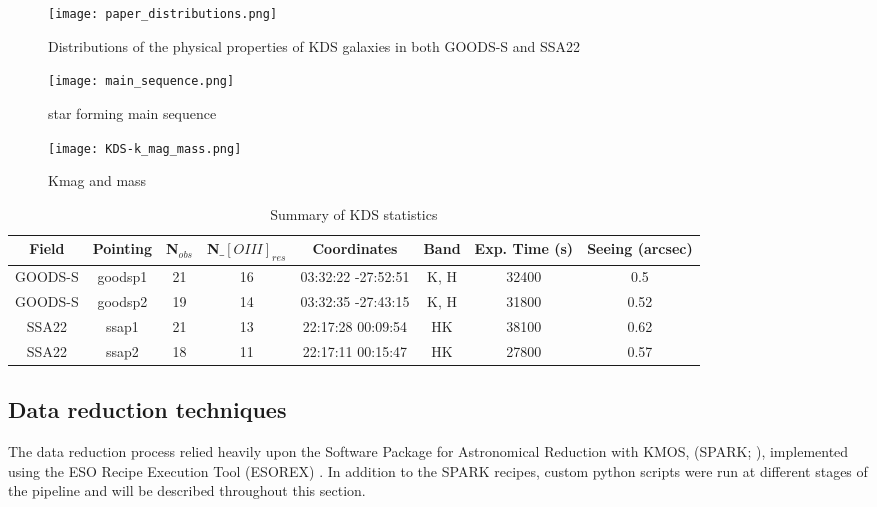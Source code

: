 \documentclass[a4paper,fleqn,usenatbib]{mn2e}
\begin{document}

\begin{figure}
\centering
\texttt{[image: paper\_distributions.png]}
\caption{Distributions of the physical properties of KDS galaxies in both GOODS-S and SSA22}
\label{fig:distributions}
\end{figure}

\begin{figure}
\centering
\texttt{[image: main\_sequence.png]}
\caption{star forming main sequence}
\label{fig:distributions}
\end{figure}

\begin{figure}
\centering
\texttt{[image: KDS-k\_mag\_mass.png]}
\caption{Kmag and mass}
\label{fig:distributions}
\end{figure}

\begin{table*}\label{tab:pointings}
    \centering
\begin{tabular}{ c c c c c c c c }

 \hline
Field & Pointing & N$_{obs}$ & N$\_[OIII]_{res}$ & Coordinates & Band & Exp. Time (s) & Seeing (arcsec)  \\
 \hline
 GOODS-S & goodsp1 & 21 & 16 & 03:32:22 -27:52:51 & K, H & 32400 & 0.5 \\
GOODS-S & goodsp2 & 19 & 14 & 03:32:35 -27:43:15 & K, H & 31800 & 0.52 \\
SSA22 & ssap1 & 21 & 13 & 22:17:28 00:09:54 & HK & 38100 & 0.62 \\
SSA22 & ssap2 & 18 & 11 & 22:17:11 00:15:47 & HK & 27800 & 0.57 \\
 \hline
\end{tabular}
\caption{Summary of KDS statistics}
\end{table*}


\subsection{Data reduction techniques}\label{subsec:datareduction}
The data reduction process relied heavily upon the Software Package for Astronomical Reduction with KMOS, (SPARK; \cite{Davies2013}), implemented using the ESO Recipe Execution Tool (ESOREX) \citep{Freudling2013}.
In addition to the SPARK recipes, custom python scripts were run at different stages of the pipeline and will be described throughout this section.
\end{document}
